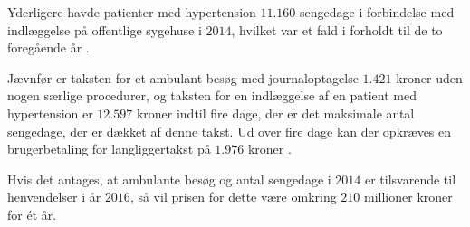 \noindent
Yderligere havde patienter med hypertension $11.160$ sengedage i forbindelse med indlæggelse på offentlige sygehuse i $2014$, hvilket var et fald i forholdt til de to foregående år \citep{sundhedsdatastyrelsen2016}. 

Jævnfør \citeauthor{takstvejledning2016} er taksten for et ambulant besøg  med journaloptagelse $1.421$ kroner uden nogen særlige procedurer, og taksten for en indlæggelse af en patient med hypertension er $12.597$ kroner indtil fire dage, der er det maksimale antal sengedage, der er dækket af denne takst. Ud over fire dage kan der opkræves en brugerbetaling for langliggertakst på $1.976$ kroner \citep{takstvejledning2016}. 

Hvis det antages, at ambulante besøg og antal sengedage i $2014$ er tilsvarende til henvendelser i år $2016$, så vil prisen for dette være omkring $210$ millioner kroner for ét år. 